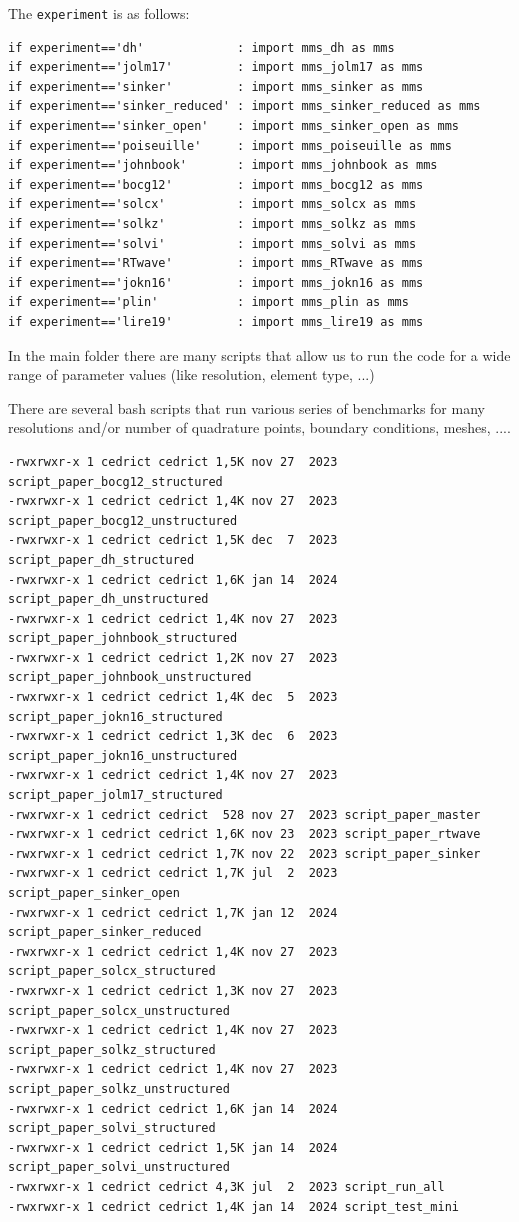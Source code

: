 The \lstinline{experiment} is as follows:
\begin{lstlisting}
if experiment=='dh'             : import mms_dh as mms
if experiment=='jolm17'         : import mms_jolm17 as mms
if experiment=='sinker'         : import mms_sinker as mms
if experiment=='sinker_reduced' : import mms_sinker_reduced as mms
if experiment=='sinker_open'    : import mms_sinker_open as mms
if experiment=='poiseuille'     : import mms_poiseuille as mms
if experiment=='johnbook'       : import mms_johnbook as mms
if experiment=='bocg12'         : import mms_bocg12 as mms
if experiment=='solcx'          : import mms_solcx as mms
if experiment=='solkz'          : import mms_solkz as mms
if experiment=='solvi'          : import mms_solvi as mms
if experiment=='RTwave'         : import mms_RTwave as mms
if experiment=='jokn16'         : import mms_jokn16 as mms
if experiment=='plin'           : import mms_plin as mms
if experiment=='lire19'         : import mms_lire19 as mms
\end{lstlisting}

In the main folder there are many scripts that allow us to run the code
for a wide range of parameter values (like resolution, element type, ...)

There are several bash scripts that run various series of benchmarks
for many resolutions and/or number of quadrature points, boundary conditions, meshes, .... 

\begin{verbatim}
-rwxrwxr-x 1 cedrict cedrict 1,5K nov 27  2023 script_paper_bocg12_structured
-rwxrwxr-x 1 cedrict cedrict 1,4K nov 27  2023 script_paper_bocg12_unstructured
-rwxrwxr-x 1 cedrict cedrict 1,5K dec  7  2023 script_paper_dh_structured
-rwxrwxr-x 1 cedrict cedrict 1,6K jan 14  2024 script_paper_dh_unstructured
-rwxrwxr-x 1 cedrict cedrict 1,4K nov 27  2023 script_paper_johnbook_structured
-rwxrwxr-x 1 cedrict cedrict 1,2K nov 27  2023 script_paper_johnbook_unstructured
-rwxrwxr-x 1 cedrict cedrict 1,4K dec  5  2023 script_paper_jokn16_structured
-rwxrwxr-x 1 cedrict cedrict 1,3K dec  6  2023 script_paper_jokn16_unstructured
-rwxrwxr-x 1 cedrict cedrict 1,4K nov 27  2023 script_paper_jolm17_structured
-rwxrwxr-x 1 cedrict cedrict  528 nov 27  2023 script_paper_master
-rwxrwxr-x 1 cedrict cedrict 1,6K nov 23  2023 script_paper_rtwave
-rwxrwxr-x 1 cedrict cedrict 1,7K nov 22  2023 script_paper_sinker
-rwxrwxr-x 1 cedrict cedrict 1,7K jul  2  2023 script_paper_sinker_open
-rwxrwxr-x 1 cedrict cedrict 1,7K jan 12  2024 script_paper_sinker_reduced
-rwxrwxr-x 1 cedrict cedrict 1,4K nov 27  2023 script_paper_solcx_structured
-rwxrwxr-x 1 cedrict cedrict 1,3K nov 27  2023 script_paper_solcx_unstructured
-rwxrwxr-x 1 cedrict cedrict 1,4K nov 27  2023 script_paper_solkz_structured
-rwxrwxr-x 1 cedrict cedrict 1,4K nov 27  2023 script_paper_solkz_unstructured
-rwxrwxr-x 1 cedrict cedrict 1,6K jan 14  2024 script_paper_solvi_structured
-rwxrwxr-x 1 cedrict cedrict 1,5K jan 14  2024 script_paper_solvi_unstructured
-rwxrwxr-x 1 cedrict cedrict 4,3K jul  2  2023 script_run_all
-rwxrwxr-x 1 cedrict cedrict 1,4K jan 14  2024 script_test_mini
\end{verbatim}




